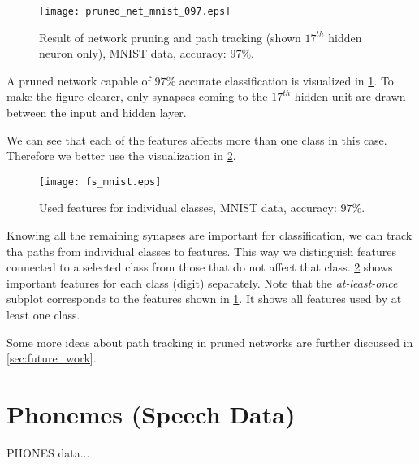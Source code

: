 \begin{figure}[H]
\centering
\texttt{[image: pruned\_net\_mnist\_097.eps]}
\caption{Result of network pruning and path tracking (shown $ 17^{th} $ hidden neuron only), MNIST data, accuracy: $ 97\% $.}
\label{fig:examples:pruned_net_mnist_097}
\end{figure}

A pruned network capable of $ 97\% $ accurate classification is visualized in \cref{fig:examples:pruned_net_mnist_097}. To make the figure clearer, only synapses coming to the $ 17^{th} $ hidden unit are drawn between the input and hidden layer.

We can see that each of the features affects more than one class in this case. Therefore we better use the visualization in \cref{fig:examples:fs_mnist}. 

\begin{figure}[H]
\centering
\texttt{[image: fs\_mnist.eps]}
\caption{Used features for individual classes, MNIST data, accuracy: $ 97\% $.}
\label{fig:examples:fs_mnist}
\end{figure}

Knowing all the remaining synapses are important for classification, we can track tha paths from individual classes to features. This way we distinguish features connected to a selected class from those that do not affect that class. \cref{fig:examples:fs_mnist} shows important features for each class (digit) separately. Note that the \textit{at-least-once} subplot corresponds to the features shown in \cref{fig:examples:pruned_net_mnist_097}. It shows all features used by at least one class.

Some more ideas about path tracking in pruned networks are further discussed in \cref{sec:future_work}.

\section{Phonemes (Speech Data)} \label{sec:example_speech}
PHONES data...
